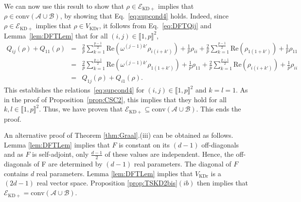 \documentclass[a4paper, notitlepage, 11pt]{article}
\numberwithin{equation}{section}
\newcommand{\Acal}{{\mathcal A}}
\newcommand{\Bcal}{{\mathcal B}}
\newcommand{\EcalKDC}{{\mathcal E}_{\mathrm{KD+}}}
\newcommand{\conv}[1]{\mathrm{conv}\left(#1\right)}
\newcommand{\VR}{V_{\mathrm{KDr}}}
\newcommand{\IntEnt}[2]{\llbracket #1 , #2 \rrbracket}
\newcommand{\convAB}{\conv{\Acal \cup \Bcal}}
\begin{document}
We can now use this result to show that $\rho\in\EcalKDC$ implies that $\rho\in\convAB$, by showing that  Eq.~\eqref{eq:supcond4} holds. Indeed, since $\rho\in\EcalKDC$ implies that $\rho\in\VR$, it follows from Eq.~\eqref{eq:DFTQij}  and Lemma~\ref{lem:DFTLem} that for all $(i,j)\in\IntEnt{1}{p}^2$, 
\begin{equation}\label{eq:DFT2}
\begin{array}{rcl}
Q_{ij}(\rho)+Q_{11}(\rho) &=&  \displaystyle \frac{2}{p} \sum_{k=1}^{\frac{p-1}{2}}\text{Re}\left(\omega^{(j-1)k'}\rho_{i (i+k')}\right) + \frac{1}{p}\rho_{i i}+  \frac{2}{p} \sum_{k=1}^{\frac{p-1}{2}}\text{Re}\left(\rho_{1 (1+k')}\right) + \frac{1}{p}\rho_{1 1} \\
&=& \displaystyle \frac{2}{p} \sum_{k=1}^{\frac{p-1}{2}}\text{Re}\left(\omega^{(j-1)k'}\rho_{1 (1+k')}\right) + \frac{1}{p}\rho_{1 1}+  \frac{2}{p} \sum_{k=1}^{\frac{p-1}{2}}\text{Re}\left(\rho_{i (i+k')}\right) + \frac{1}{p}\rho_{i i} \\
&=& Q_{1j}(\rho)+ Q_{i1}(\rho).
\end{array}
\end{equation}
This establishes the relations~\eqref{eq:supcond4}  for $(i,j)\in\IntEnt{1}{p}^2$ and $k=l=1$. As in the proof of Proposition~\ref{prop:CSC2}, this implies that they  hold for all $k,l\in\IntEnt{1}{p}^2$. Thus, we have proven that $\EcalKDC \subseteq \convAB$. This ends the proof.

 An alternative proof of Theorem \ref{thm:Graal}.(iii) can be obtained as follows. Lemma \ref{lem:DFTLem} implies that $F$ is constant on its $(d-1)$ off-diagonals and as {$F$} is self-adjoint, only $\frac{d-1}{2}$ of these values are independent. Hence, the off-diagonals of F are determined by $(d-1)$ real parameters. The diagonal of {$F$} contains $d$ real parameters. Lemma \ref{lem:DFTLem} implies that $\VR$ is a $(2d-1)$ real vector space. Proposition \ref{prop:TSKD2bis}$(ib)$ then implies that $\EcalKDC =  \convAB$.
\vskip0.2cm
\end{document}
